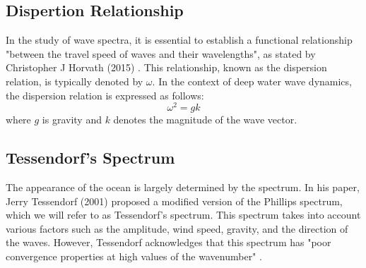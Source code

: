 \subsection{Dispertion Relationship}
In the study of wave spectra, it is essential to establish a functional relationship "between the travel speed of waves and their wavelengths", as stated by Christopher J Horvath (2015) \cite{horvath2015}. This relationship, known as the dispersion relation, is typically denoted by $\omega$. In the context of deep water wave dynamics, the dispersion relation is expressed as follows:
$$
\omega^2 = gk
$$
where $g$ is gravity and $k$ denotes the magnitude of the wave vector.

\subsection{Tessendorf's Spectrum}
The appearance of the ocean is largely determined by the spectrum. In his paper, Jerry Tessendorf (2001) \cite{tessendorf2001} proposed a modified version of the Phillips spectrum, which we will refer to as Tessendorf's spectrum. This spectrum takes into account various factors such as the amplitude, wind speed, gravity, and the direction of the waves. However, Tessendorf acknowledges that this spectrum has "poor convergence properties at high values of the wavenumber" \cite{tessendorf2001}.

